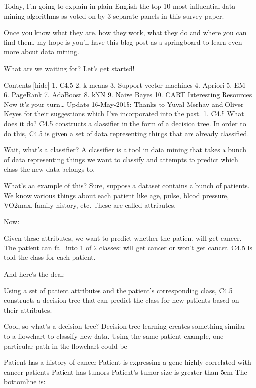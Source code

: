 

Today, I’m going to explain in plain English the top 10 most influential data mining algorithms as voted on by 3 separate panels in this survey paper.

Once you know what they are, how they work, what they do and where you can find them, my hope is you’ll have this blog post as a springboard to learn even more about data mining.

What are we waiting for? Let’s get started!


Contents [hide]
1. C4.5
2. k-means
3. Support vector machines
4. Apriori
5. EM
6. PageRank
7. AdaBoost
8. kNN
9. Naive Bayes
10. CART
Interesting Resources
Now it’s your turn…
Update 16-May-2015: Thanks to Yuval Merhav and Oliver Keyes for their suggestions which I’ve incorporated into the post.
1. C4.5
What does it do? C4.5 constructs a classifier in the form of a decision tree. In order to do this, C4.5 is given a set of data representing things that are already classified.

Wait, what’s a classifier? A classifier is a tool in data mining that takes a bunch of data representing things we want to classify and attempts to predict which class the new data belongs to.

What’s an example of this? Sure, suppose a dataset contains a bunch of patients. We know various things about each patient like age, pulse, blood pressure, VO2max, family history, etc. These are called attributes.

Now:

Given these attributes, we want to predict whether the patient will get cancer. The patient can fall into 1 of 2 classes: will get cancer or won’t get cancer. C4.5 is told the class for each patient.

And here’s the deal:

Using a set of patient attributes and the patient’s corresponding class, C4.5 constructs a decision tree that can predict the class for new patients based on their attributes.

Cool, so what’s a decision tree? Decision tree learning creates something similar to a flowchart to classify new data. Using the same patient example, one particular path in the flowchart could be:

Patient has a history of cancer
Patient is expressing a gene highly correlated with cancer patients
Patient has tumors
Patient’s tumor size is greater than 5cm
The bottomline is:

